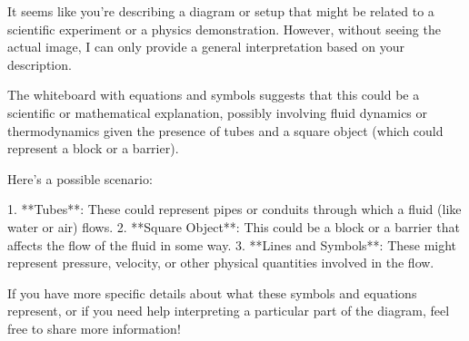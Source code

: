 It seems like you're describing a diagram or setup that might be related to a scientific experiment or a physics demonstration. However, without seeing the actual image, I can only provide a general interpretation based on your description.

The whiteboard with equations and symbols suggests that this could be a scientific or mathematical explanation, possibly involving fluid dynamics or thermodynamics given the presence of tubes and a square object (which could represent a block or a barrier).

Here's a possible scenario:

1. **Tubes**: These could represent pipes or conduits through which a fluid (like water or air) flows.
2. **Square Object**: This could be a block or a barrier that affects the flow of the fluid in some way.
3. **Lines and Symbols**: These might represent pressure, velocity, or other physical quantities involved in the flow.

If you have more specific details about what these symbols and equations represent, or if you need help interpreting a particular part of the diagram, feel free to share more information!